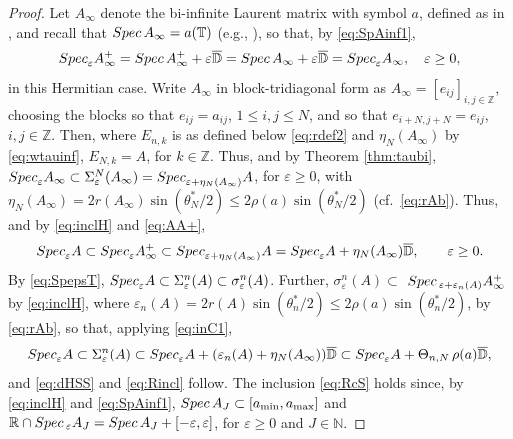 \documentclass[preprint,1p,11pt]{elsarticle}
\newcommand\D{{\mathbb D}}
\newcommand\N{{\mathbb N}}
\newcommand\T{{\mathbb T}}
\newcommand\R{{\mathbb R}}
\newcommand\Z{{\mathbb Z}}
\newcommand\eps{{\varepsilon}}
\newcommand\Spec{{\rm Spec}\,}  %
\newcommand\Specn{{\rm Spec}}   %
\newcommand\Speps{{\rm Spec}_\eps}
\numberwithin{equation}{section}   %
\numberwithin{figure}{section}  %
\begin{document}
\begin{proof} Let $A_\infty$ denote the bi-infinite Laurent matrix with symbol $a$, defined as in \cite[\S1.2]{BoeSi2}, and recall that $\Spec A_\infty = a(\T)$ (e.g., \cite[Theorem 1.2]{BoeSi2}), so that, by \eqref{eq:SpAinf1}, 
\begin{equation} \label{eq:AA+}
\Speps A^+_\infty= \Spec A^+_\infty+\eps\overline{\D} = \Spec A_\infty+\eps\overline{\D}=\Speps A_\infty, \quad \eps\geq 0, 
\end{equation}
in this Hermitian case. Write $A_\infty$ in block-tridiagonal form as $A_\infty = [e_{ij}]_{i,j\in \Z}$, choosing the blocks so that $e_{ij}=a_{ij}$, $1\leq i,j\leq N$, and so that $e_{i+N,j+N}=e_{ij}$, $i,j\in \Z$. Then,
where $E_{n,k}$ is as defined below \eqref{eq:rdef2} and $\eta_N(A_\infty)$ by \eqref{eq:wtauinf}, $E_{N,k}=A$, for $k\in \Z$. Thus, and by Theorem \ref{thm:taubi}, $\Specn_\eps A_\infty\subset \Sigma_\eps^N(A_\infty)=\Specn_{\eps+\eta_N(A_\infty)} A$, for $\eps\geq 0$, with $\eta_N(A_\infty)=2r(A_\infty)\sin(\theta^*_N/2)\leq 2\rho(a)\sin(\theta^*_N/2)$ (cf.~\eqref{eq:rAb}). Thus, and by \eqref{eq:inclH} and \eqref{eq:AA+},
\begin{equation} \label{eq:inC1}
\Speps A \subset \Speps A^+_\infty \subset \Specn_{\eps+\eta_N(A_\infty)} A= \Speps A + \eta_N(A_\infty)\overline{\D}, \qquad \eps\geq 0.
\end{equation}
By \eqref{eq:SpepsT}, $\Speps A \subset \Sigma_\eps^n(A) \subset \sigma_\eps^n(A)$. Further, $\sigma_\eps^n(A)\subset$ $\Spec_{\eps+\eps_n(A)} A^+_\infty$ by \eqref{eq:inclH}, where $\eps_n(A) = 2r(A)\sin(\theta^*_n/2)\leq 2\rho(a)\sin(\theta^*_n/2)$, by \eqref{eq:rAb}, so that, applying \eqref{eq:inC1},
$$
\Speps A \subset \Sigma_\eps^n(A) \subset \Speps A + (\eps_n(A)+\eta_N(A_\infty))\overline{\D} \subset \Speps A + \Theta_{n,N}\, \rho(a)\overline{\D},
$$
and \eqref{eq:dHSS} and \eqref{eq:Rincl} follow.
The inclusion \eqref{eq:RcS} holds since, by \eqref{eq:inclH} and \eqref{eq:SpAinf1}, $\Spec A_J \subset [a_{\min},a_{\max}]$ and $\R \cap \Spec_\eps A_J =\Spec A_J + [-\eps,\eps]$, for $\eps\geq 0$ and $J\in \N$. 
\end{proof}
\end{document}
